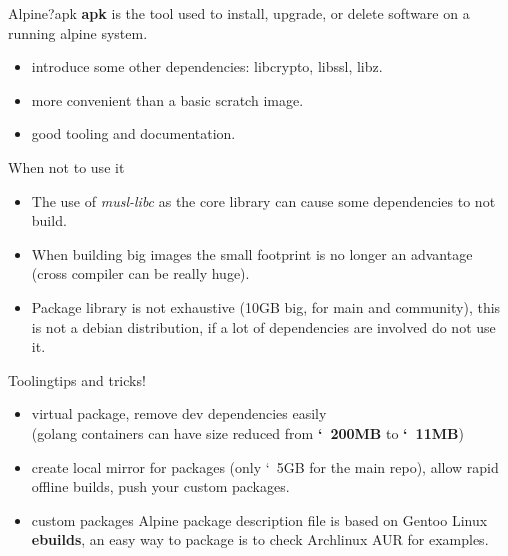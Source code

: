 \documentclass[aspectratio=169]{beamer}
\begin{document}
\begin{frame}{Alpine?}{apk}
  \textbf{apk} is the tool used to install, upgrade, or delete software on a running alpine system.

  \begin{itemize}
    \item introduce some other dependencies: libcrypto, libssl, libz.
    \item more convenient than a basic scratch image.
    \item good tooling and documentation.
  \end{itemize}
\end{frame}

\begin{frame}{When not to use it}
  \begin{itemize}
    \item The use of \textit{musl-libc} as the core library can cause some
      dependencies to not build.
    \item When building big images the small footprint is no longer an advantage
      (cross compiler can be really huge).
    \item Package library is not exhaustive (10GB big, for main and community),
      this is not a debian distribution,
      if a lot of dependencies are involved do not use it.
  \end{itemize}
\end{frame}

\begin{frame}[fragile]{Tooling}{tips and tricks!}
  \begin{itemize}
    \item virtual package, remove dev dependencies easily\\
      (golang containers can have size reduced from \textbf{\char`~200MB} to
      \textbf{\char`~11MB})
    \item create local mirror for packages (only \char`~5GB for the main repo),
      allow rapid offline builds, push your custom packages.
    \item custom packages Alpine package description file is based on Gentoo Linux
      \textbf{ebuilds}, an easy way to package is to check Archlinux AUR for examples.
  \end{itemize}
\end{frame}
\end{document}
